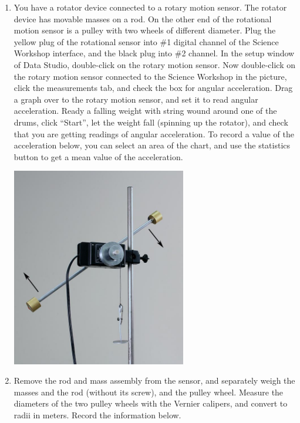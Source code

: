 \begin{enumerate}[label=\arabic*.]

\item You have a rotator device connected to a rotary motion sensor.  The rotator device has movable masses on a rod.  On the other end of the rotational motion sensor is a pulley with two wheels of different diameter.  Plug the yellow plug of the rotational sensor into \#1 digital channel of the Science Workshop interface, and the black plug into \#2 channel.  In the setup window of Data Studio, double-click on the rotary motion sensor.  Now double-click on the rotary motion sensor connected to the Science Workshop in the picture, click the measurements tab, and check the box for angular acceleration.  Drag a graph over to the rotary motion sensor, and set it to read angular acceleration.  Ready a falling weight with string wound around one of the drums, click ``Start'', let the weight fall (spinning up the rotator), and check that you are getting readings of angular acceleration.  To record a value of the acceleration below, you can select an area of the chart, and use the statistics button to get a mean value of the acceleration.
\begin{center} \includegraphics*[width=0.6\textwidth]{imgs/6labs/6Alab/6Aexp7/IMG_5643_pdf.jpg} \end{center}

\item Remove the rod and mass assembly from the sensor, and separately weigh the masses and the rod (without its screw), and the pulley wheel.  Measure the diameters of the two pulley wheels with the Vernier calipers, and convert to radii in meters.  Record the information below.


\end{enumerate}

